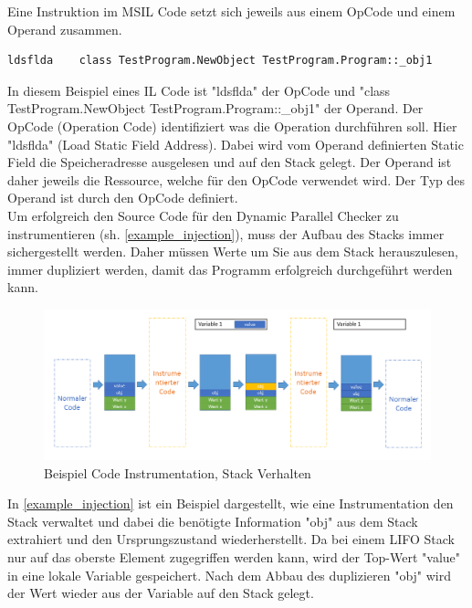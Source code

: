 \documentclass[10pt,a4paper]{article}
\begin{document}
\begin{flushleft}
\begin{figure}[H]
\end{figure}
Eine Instruktion im MSIL Code setzt sich jeweils aus einem OpCode und einem Operand zusammen.
\begin{lstlisting}
ldsflda    class TestProgram.NewObject TestProgram.Program::_obj1
\end{lstlisting}
In diesem Beispiel eines IL Code ist "ldsflda" der OpCode und "class TestProgram.NewObject TestProgram.Program::\_obj1" der Operand. Der OpCode (Operation Code) identifiziert was die Operation durchführen soll. Hier "ldsflda" (Load Static Field Address). Dabei wird vom Operand definierten Static Field die Speicheradresse ausgelesen und auf den Stack gelegt. Der Operand ist daher jeweils die Ressource, welche für den OpCode verwendet wird. Der Typ des Operand ist durch den OpCode definiert.\\
Um erfolgreich den Source Code für den Dynamic Parallel Checker zu instrumentieren (sh. \autoref{example_injection}), muss der Aufbau des Stacks immer sichergestellt werden. Daher müssen Werte um Sie aus dem Stack herauszulesen, immer dupliziert werden, damit das Programm erfolgreich durchgeführt werden kann.\\
\begin{figure}[H]
\centering
\includegraphics[scale=0.5]{images/BeispielInjection.png}
\caption{Beispiel Code Instrumentation, Stack Verhalten}
\label{example_injection}
\end{figure}
In \autoref{example_injection} ist ein Beispiel dargestellt, wie eine Instrumentation den Stack verwaltet und dabei die benötigte Information "obj" aus dem Stack extrahiert und den Ursprungszustand wiederherstellt. Da bei einem LIFO Stack nur auf das oberste Element zugegriffen werden kann, wird der Top-Wert "value" in eine lokale Variable gespeichert. Nach dem Abbau des duplizieren "obj" wird der Wert wieder aus der Variable auf den Stack gelegt.
\end{flushleft}
\end{document}
